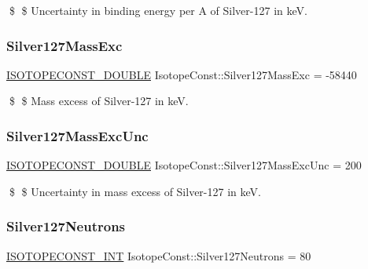 \$ \$ Uncertainty in binding energy per A of Silver-\/127 in keV. \mbox{\label{group___isotope_const-_silver-_ag127_ga0e10e4aeaa2b0d4522840549bac00e8b}} 
\subsubsection{\texorpdfstring{Silver127\+Mass\+Exc}{Silver127MassExc}}
{\footnotesize\ttfamily \mbox{\hyperlink{group___isotope_const-_macros_ga8f45a7272ce02c0b4c65c44636ed719a}{I\+S\+O\+T\+O\+P\+E\+C\+O\+N\+S\+T\+\_\+\+D\+O\+U\+B\+LE}} Isotope\+Const\+::\+Silver127\+Mass\+Exc = -\/58440}

\$ \$ Mass excess of Silver-\/127 in keV. \mbox{\label{group___isotope_const-_silver-_ag127_gaeec1e73fd0580f97546a25c12ed08f87}} 
\subsubsection{\texorpdfstring{Silver127\+Mass\+Exc\+Unc}{Silver127MassExcUnc}}
{\footnotesize\ttfamily \mbox{\hyperlink{group___isotope_const-_macros_ga8f45a7272ce02c0b4c65c44636ed719a}{I\+S\+O\+T\+O\+P\+E\+C\+O\+N\+S\+T\+\_\+\+D\+O\+U\+B\+LE}} Isotope\+Const\+::\+Silver127\+Mass\+Exc\+Unc = 200}

\$ \$ Uncertainty in mass excess of Silver-\/127 in keV. \mbox{\label{group___isotope_const-_silver-_ag127_ga25c19509cf5772261e20314544dbc42f}} 
\subsubsection{\texorpdfstring{Silver127\+Neutrons}{Silver127Neutrons}}
{\footnotesize\ttfamily \mbox{\hyperlink{group___isotope_const-_macros_ga5f18360b3e99483a35c32d789e62621c}{I\+S\+O\+T\+O\+P\+E\+C\+O\+N\+S\+T\+\_\+\+I\+NT}} Isotope\+Const\+::\+Silver127\+Neutrons = 80}

